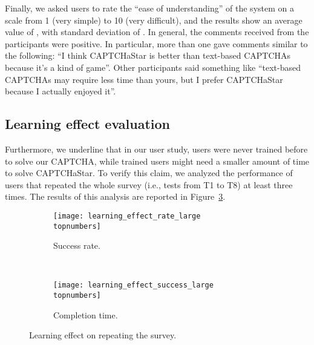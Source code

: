\documentclass[conference]{IEEEtran}
\newcommand{\topnumbers}{}
\newcommand{\hilight}[1]{#1}
\begin{document}
Finally, we asked users to rate the ``ease of understanding'' \hilight{of the system} on a scale from 1 (very simple) to 10 (very difficult), and the results show an average value of , with standard deviation of .
In general, the comments received from the participants were positive. In particular, more than one gave comments similar to the following: ``I think CAPTCHaStar is better than text-based CAPTCHAs because it's a kind of game''. Other participants said something like ``text-based CAPTCHAs may require less time than yours, but I prefer CAPTCHaStar because I actually enjoyed it''.


\subsection{Learning effect evaluation}
Furthermore, we underline that in our user study, users were never trained before to solve our CAPTCHA, while trained users might need a smaller amount of time to solve CAPTCHaStar.
To verify this claim, we analyzed the performance of  users that repeated the whole survey (i.e., tests from T1 to T8) at least three times.
The results of this analysis are reported in Figure~\ref{fig:learning_effect}. \begin{figure}[t]
\centering
\begin{subfigure}{.48\textwidth}
\texttt{[image: learning\_effect\_rate\_large\\topnumbers]}
\caption{Success rate.}
\label{fig:learning_effect_rate}
\end{subfigure}
\\
\vspace{0.5cm}
\begin{subfigure}{.48\textwidth}
\texttt{[image: learning\_effect\_success\_large\\topnumbers]}
\caption{Completion time.}
\label{fig:learning_effect_success}
\end{subfigure}
\caption{Learning effect on repeating the survey.}
\label{fig:learning_effect}
\end{figure}


\begin{comment}
\begin{figure}[h!]
\begin{subfigure}{.22\textwidth}
\texttt{[image: learning\_effect\_rate\_new\\topnumbers]}
\caption{Success rate.}
\label{fig:learning_effect_rate}
\end{subfigure}
\hspace{0.1cm}
\begin{subfigure}{.22\textwidth}
\texttt{[image: learning\_effect\_success\_new\\topnumbers]}
\caption{Completion time.}
\label{fig:learning_effect_success}
\end{subfigure}
\vspace{-0.25cm}
\caption{Learning effect on repeating the survey.}
\label{fig:learning_effect}
\end{figure}
\end{comment}
\end{document}
